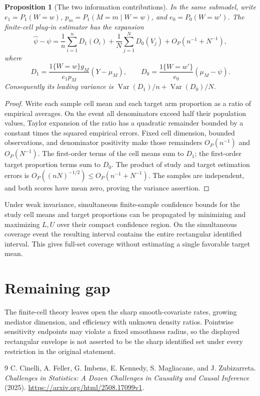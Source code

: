 \documentclass[11pt]{article}
\newtheorem{proposition}[theorem]{Proposition}
\theoremstyle{remark}
\begin{document}
\begin{proposition}[The two information contributions]
In the same submodel, write $e_1=P_1(W=w)$, $p_m=P_1(M=m\mid W=w)$, and $e_0=P_0(W=w')$. The finite-cell plug-in estimator has the expansion
\[
 \widehat\psi-\psi=\frac1n\sum_{i=1}^n D_1(O_i)+\frac1N\sum_{j=1}^N D_0(V_j)
 +O_P(n^{-1}+N^{-1}),
\]
where
\[
 D_1=\frac{1\{W=w\}g_M}{e_1p_M}(Y-\mu_M),\qquad
 D_0=\frac{1\{W=w'\}}{e_0}(\mu_M-\psi).
\]
Consequently its leading variance is $\operatorname{Var}(D_1)/n+\operatorname{Var}(D_0)/N$.
\end{proposition}
\begin{proof}
Write each sample cell mean and each target arm proportion as a ratio of empirical averages. On the event all denominators exceed half their population values, Taylor expansion of the ratio has a quadratic remainder bounded by a constant times the squared empirical errors. Fixed cell dimension, bounded observations, and denominator positivity make those remainders $O_P(n^{-1})$ and $O_P(N^{-1})$. The first-order terms of the cell means sum to $D_1$; the first-order target proportion terms sum to $D_0$. The product of study and target estimation errors is $O_P((nN)^{-1/2})\le O_P(n^{-1}+N^{-1})$. The samples are independent, and both scores have mean zero, proving the variance assertion.
\end{proof}
Under weak invariance, simultaneous finite-sample confidence bounds for the study cell means and target proportions can be propagated by minimizing and maximizing $L,U$ over their compact confidence region. On the simultaneous coverage event the resulting interval contains the entire rectangular identified interval. This gives full-set coverage without estimating a single favorable target mean.

\section*{Remaining gap}
The finite-cell theory leaves open the sharp smooth-covariate rates, growing mediator dimension, and efficiency with unknown density ratios. Pointwise sensitivity endpoints may violate a fixed smoothness radius, so the displayed rectangular envelope is not asserted to be the sharp identified set under every restriction in the original statement.

\begin{thebibliography}{9}
 C. Cinelli, A. Feller, G. Imbens, E. Kennedy, S. Magliacane, and J. Zubizarreta. \emph{Challenges in Statistics: A Dozen Challenges in Causality and Causal Inference} (2025). \url{https://arxiv.org/html/2508.17099v1}.
\end{thebibliography}
\end{document}
